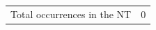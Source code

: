 			\begin{tabular}{ll}
				Total occurrences in the NT & 0
			\end{tabular}
			
			
		
			
				
				
				
		
